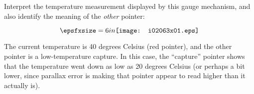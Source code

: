 

Interpret the temperature measurement displayed by this gauge mechanism, and also identify the meaning of the {\it other} pointer:

$$\epsfxsize=6in \texttt{[image: i02063x01.eps]}$$







The current temperature is 40 degrees Celsius (red pointer), and the other pointer is a low-temperature capture.  In this case, the ``capture'' pointer shows that the temperature went down as low as 20 degrees Celsius (or perhaps a bit lower, since parallax error is making that pointer appear to read higher than it actually is).
 










